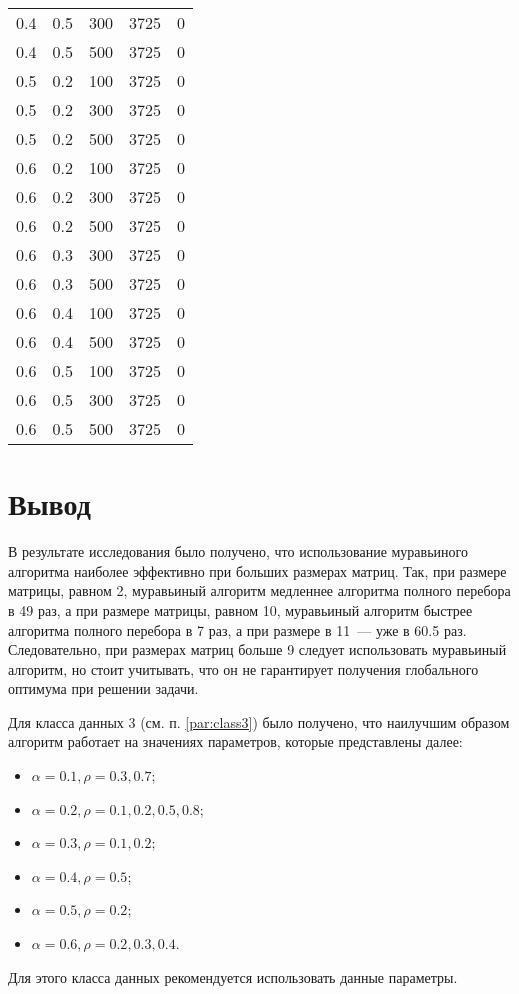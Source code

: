 \begin{center}
\begin{longtable}[c]{|r|r|r|r|r|}
		0.4 &  0.5 &  300 & 3725 &     0 \\
		0.4 &  0.5 &  500 & 3725 &     0 \\ \hline
		0.5 &  0.2 &  100 & 3725 &     0 \\
		0.5 &  0.2 &  300 & 3725 &     0 \\
		0.5 &  0.2 &  500 & 3725 &     0 \\ \hline
		0.6 &  0.2 &  100 & 3725 &     0 \\
		0.6 &  0.2 &  300 & 3725 &     0 \\
		0.6 &  0.2 &  500 & 3725 &     0 \\ \hline
		0.6 &  0.3 &  300 & 3725 &     0 \\
		0.6 &  0.3 &  500 & 3725 &     0 \\ \hline
		0.6 &  0.4 &  100 & 3725 &     0 \\
		0.6 &  0.4 &  500 & 3725 &     0 \\ \hline
		0.6 &  0.5 &  100 & 3725 &     0 \\
		0.6 &  0.5 &  300 & 3725 &     0 \\
		0.6 &  0.5 &  500 & 3725 &     0 \\ \hline
	\end{longtable}
\end{center}

\section{Вывод}

В результате исследования было получено, что использование муравьиного алгоритма наиболее эффективно при больших размерах матриц.
Так, при размере матрицы, равном 2, муравьиный алгоритм медленнее алгоритма полного перебора в 49 раз, а при размере матрицы, равном 10, муравьиный алгоритм быстрее алгоритма полного перебора в 7 раз, а при размере в 11~--- уже в 60.5 раз.
Следовательно, при размерах матриц больше 9 следует использовать муравьиный алгоритм, но стоит учитывать, что он не гарантирует получения глобального оптимума при решении задачи.

Для класса данных 3 (см. п. \ref{par:class3}) было получено, что наилучшим образом алгоритм работает на значениях параметров, которые представлены далее:
\begin{itemize}[label=---]
	\item $\alpha = 0.1, \rho = 0.3, 0.7$;
	\item $\alpha = 0.2, \rho = 0.1, 0.2, 0.5, 0.8$;
	\item $\alpha = 0.3, \rho = 0.1, 0.2$;
	\item $\alpha = 0.4, \rho = 0.5$;
	\item $\alpha = 0.5, \rho = 0.2$;
	\item $\alpha = 0.6, \rho = 0.2, 0.3, 0.4$.
\end{itemize} 
Для этого класса данных рекомендуется использовать данные параметры.